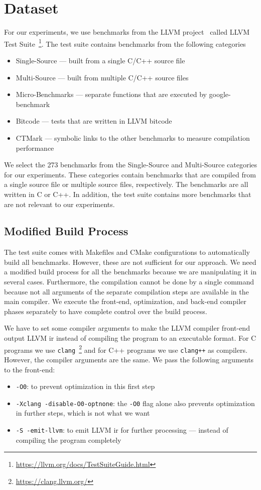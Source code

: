 \section{Dataset}
\label{sec:approach:dataset}
For our experiments, we use benchmarks from the LLVM project~\cite{LLVM:CGO04} called LLVM Test Suite~\footnote{\url{https://llvm.org/docs/TestSuiteGuide.html}}.
The test suite contains benchmarks from the following categories
\begin{itemize}
    \item Single-Source --- built from a single C/C++ source file
    \item Multi-Source --- built from multiple C/C++ source files
    \item Micro-Benchmarks --- separate functions that are executed by google-benchmark
    \item Bitcode --- tests that are written in LLVM bitcode
    \item CTMark --- symbolic links to the other benchmarks to measure compilation performance
\end{itemize}
We select the 273 benchmarks from the Single-Source and Multi-Source categories for our experiments.
These categories contain benchmarks that are compiled from a single source file or multiple source files, respectively.
The benchmarks are all written in C or C++.
In addition, the test suite contains more benchmarks that are not relevant to our experiments. 

\subsection{Modified Build Process}
\label{sec:approach:build_process}
The test suite comes with Makefiles and CMake configurations to automatically build all benchmarks.
However, these are not sufficient for our approach.
We need a modified build process for all the benchmarks because we are manipulating it in several cases.
Furthermore, the compilation cannot be done by a single command because not all arguments of the separate compilation steps are available in the main compiler.
We execute the front-end, optimization, and back-end compiler phases separately to have complete control over the build process.

We have to set some compiler arguments to make the LLVM compiler front-end output LLVM \ac{ir} instead of compiling the program to an executable format.
For C programs we use \lstinline{clang}~\footnote{\url{https://clang.llvm.org/}} and for C++ programs we use \lstinline{clang++} as compilers.
However, the compiler arguments are the same.
We pass the following arguments to the front-end:
\begin{itemize}
    \item \lstinline{-O0}: to prevent optimization in this first step
    \item \lstinline{-Xclang -disable-O0-optnone}: the \lstinline{-O0} flag alone also prevents optimization in further steps, which is not what we want
    \item \lstinline{-S -emit-llvm}: to emit LLVM \ac{ir} for further processing --- instead of compiling the program completely
\end{itemize}

